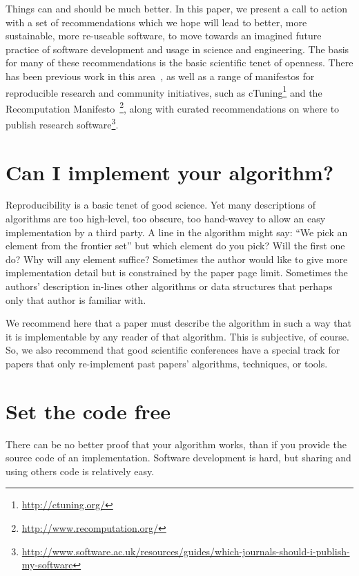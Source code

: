\documentclass[conference]{IEEEtran}
\begin{document}
Things can and should be much better. In this paper, we present a call
to action with a set of recommendations which we hope will lead to
better, more sustainable, more re-useable software, to move towards an
imagined future practice of software development and usage in science
and engineering.  The basis for many of these recommendations is the
basic scientific tenet of openness. There has been previous work in
this area~\cite{sim-et-al:2003,chirigati-et-al:2013}, as well as a
range of manifestos for reproducible research and community
initiatives, such as cTuning\footnote{\url{http://ctuning.org/}} and
the Recomputation
Manifesto~\cite{gent:2013}\footnote{\url{http://www.recomputation.org/}},
along with curated recommendations on where to publish research
software\footnote{\url{http://www.software.ac.uk/resources/guides/which-journals-should-i-publish-my-software}}.

\section{Can I implement your algorithm?}

Reproducibility is a basic tenet of good science. Yet many
descriptions of algorithms are too high-level, too obscure, too
hand-wavey to allow an easy implementation by a third party. A line in
the algorithm might say: ``We pick an element from the frontier set''
but which element do you pick? Will the first one do? Why will any
element suffice? Sometimes the author would like to give more
implementation detail but is constrained by the paper page
limit. Sometimes the authors' description in-lines other algorithms or
data structures that perhaps only that author is familiar with.

We recommend here that a paper must describe the algorithm in such a
way that it is implementable by any reader of that algorithm. This is
subjective, of course. So, we also recommend that good scientific
conferences have a special track for papers that only re-implement
past papers' algorithms, techniques, or tools.


\section{Set the code free} 

There can be no better proof that your algorithm works, than if you
provide the source code of an implementation. Software development is
hard, but sharing and using others code is relatively easy.
\end{document}
